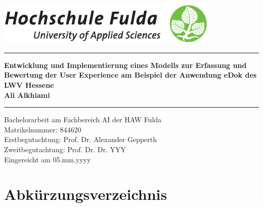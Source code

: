 \documentclass[12pt,oneside]{article}
\newcommand{\HSFTitle}[8]{

  \thispagestyle{empty}
\begin{center}
    \includegraphics[width=0.8\textwidth]{logo.eps} \\
    \vspace*{\stretch{1}}
    \end{center}

  {\parindent0cm
  \rule{\linewidth}{.7ex}}
  \begin{center}
    \vspace*{\stretch{1}}
    \sffamily\bfseries\Huge
    #1\\
    \vspace*{\stretch{1}}
    \sffamily\bfseries\large
    #3
    \vspace*{\stretch{1}}
  \end{center}
  \rule{\linewidth}{.7ex}

  \vspace*{\stretch{2}}
  \begin{center}
    \Large #2 am #5 der HAW Fulda \\
    \vspace*{\stretch{1}} 
    \large Matrikelnummer:  #4 \\[1mm]
    \large Erstbegutachtung:  #7 \\[1mm]
    \large Zweitbegutachtung:  #8 \\[1mm]
    \vspace*{\stretch{1}}
    \large Eingereicht am #6
  \end{center}
}
\begin{document}
 
 

 \HSFTitle
      {Entwicklung und Implementierung eines Modells zur Erfassung und Bewertung der User Experience am Beispiel der Anwendung eDok des LWV Hessene }        %
      {Bachelorarbeit} %
      {Ali Alkhiami}          %
      {844620}
      {Fachbereich AI}  %
      {05.mm.yyyy}        %
      {Prof. Dr. Alexander Gepperth}     %
      {Prof. Dr. Dr. YYY}    %

  \clearpage

\lhead{}
    \setcounter{page}{1}
\tableofcontents
\section{Abkürzungsverzeichnis}
\begin{acronym}[hyperlinks]
\end{acronym}
\end{document}
